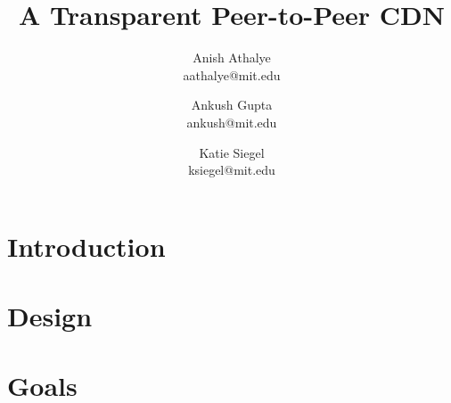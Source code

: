 \documentclass[letterpaper,twocolumn,10pt]{article}
\begin{document}
\title{\Large \bf A Transparent Peer-to-Peer CDN}

\author{
    {\rm Anish Athalye}\\
    aathalye@mit.edu
    \and
    {\rm Ankush Gupta}\\
    ankush@mit.edu
    \and
    {\rm Katie Siegel}\\
    ksiegel@mit.edu
}

\maketitle

\thispagestyle{empty}

\begin{abstract}

\end{abstract}

\section{Introduction}

\section{Design}

\section{Goals}

{\footnotesize 
}
\end{document}
